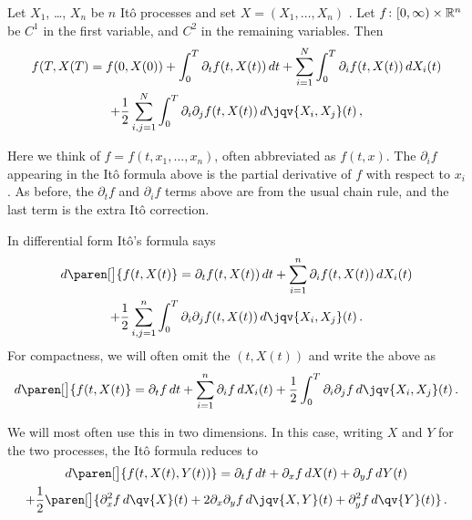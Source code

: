 \begin{theorem}
  Let $X_1$, \dots, $X_n$ be $n$ It\^o processes and set $X = (X_1, \dots, X_n)$ .
  Let $f\colon [0, \infty)\times \mathbb{R}^n$ be $C^1$ in the first variable, and $C^2$ in the remaining variables.
  Then
  \begin{multline*}
    f(T, X(T)
      = f(0, X(0))
	+ \int_0^T \partial_t f(t, X(t)) \, dt 
	+ \sum_{i=1}^{N} \int_0^T \partial_i f(t, X(t)) \, dX_i(t)
    \\
	+ \frac{1}{2} \sum_{i,j=1}^N \int_0^T \partial_i \partial_j f(t, X(t)) \, d\jqv{X_i, X_j}(t)\,,
  \end{multline*}
\end{theorem}
\begin{remark}
  Here we think of $f = f(t, x_1, \dots, x_n)$, often abbreviated as $f(t, x)$.
  The $\partial_i f$ appearing in the It\^o formula above is the partial derivative of $f$ with respect to $x_i$.
  As before, the $\partial_t f$ and $\partial_i f$ terms above are from the usual chain rule, and the last term is the extra It\^o correction.
\end{remark}
\begin{remark}
  In differential form It\^o's formula says
  \begin{multline*}
    d\paren[\big]{ f(t, X(t)}
      = \partial_t f(t, X(t)) \, dt 
	+ \sum_{i=1}^{n} \partial_i f(t, X(t)) \, dX_i(t)
    \\
	+ \frac{1}{2} \sum_{i,j = 1}^n
	  \int_0^T \partial_i \partial_j f(t, X(t)) \, d\jqv{X_i, X_j}(t)\,.
  \end{multline*}
  For compactness, we will often omit the $(t, X(t))$ and write the above as
  \begin{equation*}
    d\paren[\big]{ f(t, X(t)}
      = \partial_t f \, dt 
	+ \sum_{i=1}^{n} \partial_i f \, dX_i(t)
	+ \frac{1}{2} \int_0^T \partial_i \partial_j f \, d\jqv{X_i, X_j}(t)\,.
  \end{equation*}
\end{remark}
\begin{remark}
  We will most often use this in two dimensions.
  In this case, writing $X$ and $Y$ for the two processes, the It\^o formula reduces to
  \begin{multline*}
    d\paren[\big]{f(t, X(t), Y(t))}
      = \partial_t f \, dt
	+ \partial_x f \, dX(t)
	+ \partial_y f \, dY(t)
    \\
	+ \frac{1}{2} \paren[\big]{
	    \partial_x^2 f \, d\qv{X}(t)
	    + 2 \partial_x \partial_y f \, d\jqv{X,Y}(t)
	    + \partial_y^2 f \, d\qv{Y}(t)
	}\,.
  \end{multline*}
\end{remark}

